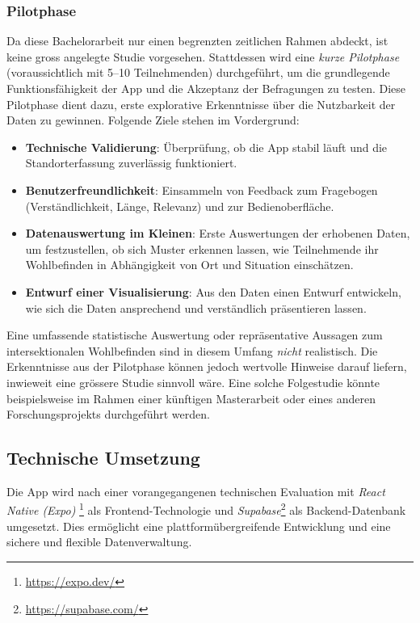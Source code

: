 \documentclass{template}
\begin{document}
\subsubsection{Pilotphase}
Da diese Bachelorarbeit nur einen begrenzten zeitlichen Rahmen abdeckt, ist keine gross angelegte Studie vorgesehen. Stattdessen wird eine \textit{kurze Pilotphase} (voraussichtlich mit 5–10 Teilnehmenden) durchgeführt, um die grundlegende Funktionsfähigkeit der App und die Akzeptanz der Befragungen zu testen. Diese Pilotphase dient dazu, erste explorative Erkenntnisse über die Nutzbarkeit der Daten zu gewinnen. Folgende Ziele stehen im Vordergrund:

\begin{itemize}
    \item \textbf{Technische Validierung}: Überprüfung, ob die App stabil läuft und die Standorterfassung zuverlässig funktioniert.
    \item \textbf{Benutzerfreundlichkeit}: Einsammeln von Feedback zum Fragebogen (Verständlichkeit, Länge, Relevanz) und zur Bedienoberfläche.
    \item \textbf{Datenauswertung im Kleinen}: Erste Auswertungen der erhobenen Daten, um festzustellen, ob sich Muster erkennen lassen, wie Teilnehmende ihr Wohlbefinden in Abhängigkeit von Ort und Situation einschätzen.
    \item \textbf{Entwurf einer Visualisierung}: Aus den Daten einen Entwurf entwickeln, wie sich die Daten ansprechend und verständlich präsentieren lassen.
\end{itemize}

Eine umfassende statistische Auswertung oder repräsentative Aussagen zum intersektionalen Wohlbefinden sind in diesem Umfang \textit{nicht} realistisch. Die Erkenntnisse aus der Pilotphase können jedoch wertvolle Hinweise darauf liefern, inwieweit eine grössere Studie sinnvoll wäre. Eine solche Folgestudie könnte beispielsweise im Rahmen einer künftigen Masterarbeit oder eines anderen Forschungsprojekts durchgeführt werden.

\subsection{Technische Umsetzung}
Die App wird nach einer vorangegangenen technischen Evaluation mit \emph{React Native (Expo)} \footnote{\href{https://expo.dev/}{https://expo.dev/}} als Frontend-Technologie und \emph{Supabase}\footnote{\href{https://supabase.com/}{https://supabase.com/}} als Backend-Datenbank umgesetzt. Dies ermöglicht eine plattformübergreifende Entwicklung und eine sichere und flexible Datenverwaltung.
\end{document}
